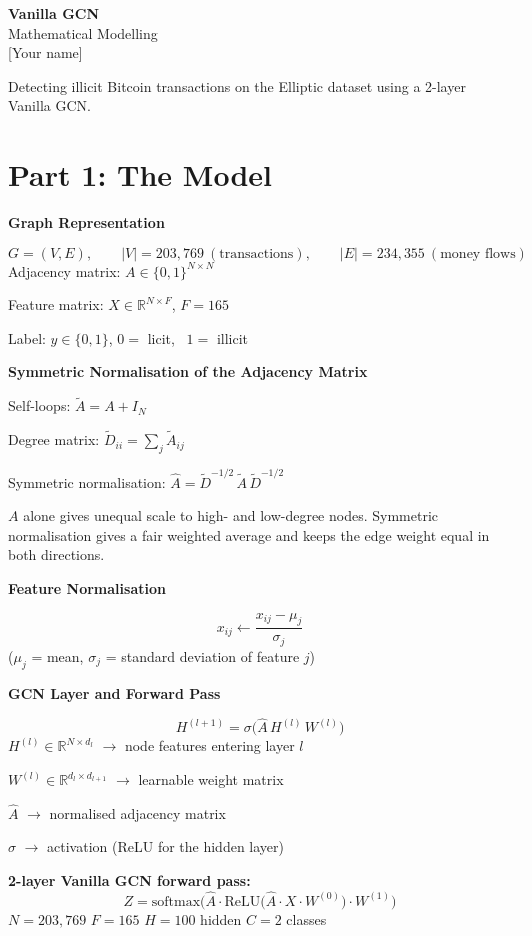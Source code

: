 \documentclass[12pt,a4paper]{article}
\newcommand{\Ahat}{\hat A}
\newcommand{\R}{\mathbb{R}}
\newcommand{\h}[1]{\par\medskip\textbf{\large #1}\par}
\begin{document}
\begin{center}
{\Large\bfseries Vanilla GCN}\\[2pt]
{\large Mathematical Modelling}\\[6pt]
[Your name] \quad [Roll no.]
\end{center}

Detecting illicit Bitcoin transactions on the Elliptic dataset using a 2-layer Vanilla GCN.

\section*{Part 1: The Model}

\h{Graph Representation}
\[
  G = (V, E), \qquad |V| = 203{,}769 \ (\text{transactions}), \qquad |E| = 234{,}355 \ (\text{money flows})
\]
Adjacency matrix: \quad $A \in \{0,1\}^{N\times N}$

Feature matrix: \quad $X \in \R^{N\times F}$, \quad $F = 165$

Label: \quad $y \in \{0, 1\}$, \quad $0 = $ licit, \ $1 = $ illicit

\h{Symmetric Normalisation of the Adjacency Matrix}
Self-loops: \quad $\tilde A = A + I_N$

Degree matrix: \quad $\tilde D_{ii} = \sum_j \tilde A_{ij}$

Symmetric normalisation: \quad $\Ahat = \tilde D^{-1/2}\, \tilde A\, \tilde D^{-1/2}$

$A$ alone gives unequal scale to high- and low-degree nodes. Symmetric normalisation gives a fair weighted average and
keeps the edge weight equal in both directions.

\h{Feature Normalisation}
\[
  x_{ij} \leftarrow \frac{x_{ij} - \mu_j}{\sigma_j}
\]
($\mu_j$ = mean, $\sigma_j$ = standard deviation of feature $j$)

\h{GCN Layer and Forward Pass}
\[
  H^{(l+1)} = \sigma\big(\Ahat\, H^{(l)}\, W^{(l)}\big)
\]
$H^{(l)} \in \R^{N\times d_l}$ $\rightarrow$ node features entering layer $l$

$W^{(l)} \in \R^{d_l\times d_{l+1}}$ $\rightarrow$ learnable weight matrix

$\Ahat$ $\rightarrow$ normalised adjacency matrix

$\sigma$ $\rightarrow$ activation (ReLU for the hidden layer)

\textbf{2-layer Vanilla GCN forward pass:}
\[
  Z = \mathrm{softmax}\Big(\Ahat\cdot \mathrm{ReLU}\big(\Ahat\cdot X\cdot W^{(0)}\big)\cdot W^{(1)}\Big)
\]
$N = 203{,}769$ \qquad $F = 165$ \qquad $H = 100$ hidden \qquad $C = 2$ classes
\end{document}
